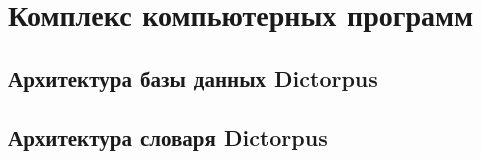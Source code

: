\chapter{Комплекс компьютерных программ} \label{chapt_complex_software}





\section{Архитектура базы данных Dictorpus} \label{sect_arch_db}





\section{Архитектура словаря Dictorpus} \label{sect_dictionary}







